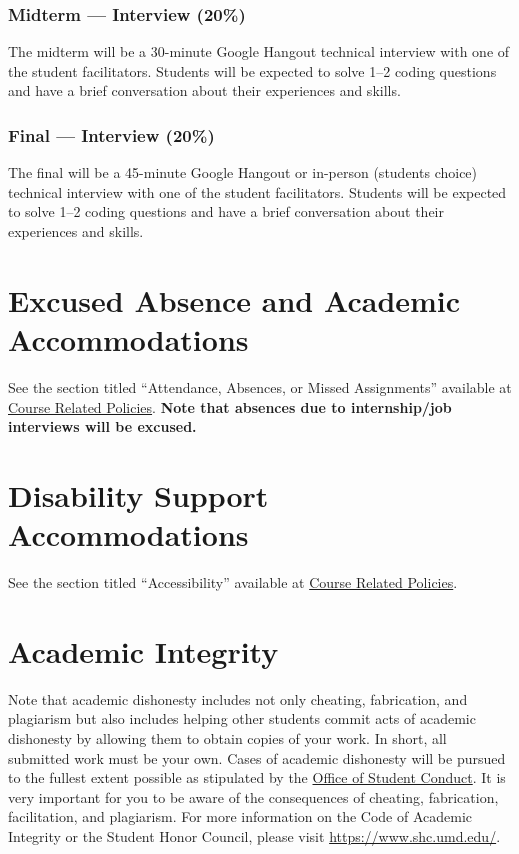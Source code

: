 \documentclass[12pt]{article}
\begin{document}
\subsubsection*{Midterm --- Interview (20\%)}
The midterm will be a 30-minute Google Hangout technical interview with one of the student facilitators.
Students will be expected to solve 1--2 coding questions and have a brief conversation about their experiences and skills.

\subsubsection*{Final --- Interview (20\%)}
The final will be a 45-minute Google Hangout or in-person (students choice) technical interview with one of the student facilitators.
Students will be expected to solve 1--2 coding questions and have a brief conversation about their experiences and skills.


\section*{Excused Absence and Academic Accommodations}
See the section titled ``Attendance, Absences, or Missed Assignments'' available at \href{https://www.ugst.umd.edu/courserelatedpolicies.html}{Course Related Policies}.
\textbf{Note that absences due to internship/job interviews will be excused.}

\section*{Disability Support Accommodations}
See the section titled ``Accessibility'' available at \href{https://www.ugst.umd.edu/courserelatedpolicies.html}{Course Related Policies}.

\section*{Academic Integrity}
Note that academic dishonesty includes not only cheating, fabrication, and plagiarism but also includes helping other students commit acts of academic dishonesty by allowing them to obtain copies of your work.
In short, all submitted work must be your own.
Cases of academic dishonesty will be pursued to the fullest extent possible as stipulated by the \href{https://www.studentconduct.umd.edu/}{Office of Student Conduct}.
It is very important for you to be aware of the consequences of cheating, fabrication, facilitation, and plagiarism.
For more information on the Code of Academic Integrity or the Student Honor Council, please visit \href{https://www.shc.umd.edu/}{https://www.shc.umd.edu/}.
\end{document}

